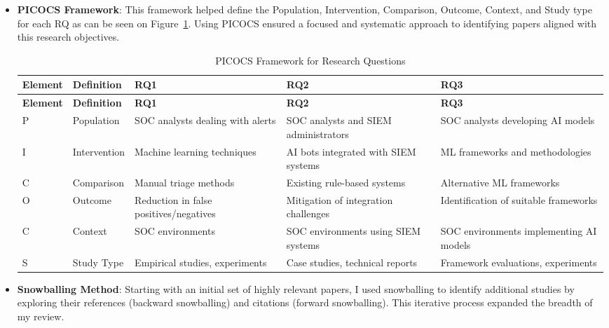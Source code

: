 \begin{itemize}
    \item \textbf{PICOCS Framework}: This framework helped define the Population, Intervention, Comparison, Outcome, Context, and Study type for each RQ as can be seen on Figure~\ref{tab:picocs_rqs}. Using PICOCS ensured a focused and systematic approach to identifying papers aligned with this research objectives.

\captionsetup[table]{font=small} %
\scriptsize %
\begin{longtable}{p{1cm}p{1.5cm}p{3cm}p{3cm}p{3cm}}
    \caption{PICOCS Framework for Research Questions}
    \label{tab:picocs_rqs} \\
    \toprule
    \textbf{Element} & \textbf{Definition} & \textbf{RQ1} & \textbf{RQ2} & \textbf{RQ3} \\
    \midrule
    \endfirsthead
    \toprule
    \textbf{Element} & \textbf{Definition} & \textbf{RQ1} & \textbf{RQ2} & \textbf{RQ3} \\
    \midrule
    \endhead
    \bottomrule
    \endfoot
    \bottomrule
    \endlastfoot
    P & Population & SOC analysts dealing with alerts & SOC analysts and SIEM administrators & SOC analysts developing AI models \\
    I & Intervention & Machine learning techniques & AI bots integrated with SIEM systems & ML frameworks and methodologies \\
    C & Comparison & Manual triage methods & Existing rule-based systems & Alternative ML frameworks \\
    O & Outcome & Reduction in false positives/negatives & Mitigation of integration challenges & Identification of suitable frameworks \\
    C & Context & SOC environments & SOC environments using SIEM systems & SOC environments implementing AI models \\
    S & Study Type & Empirical studies, experiments & Case studies, technical reports & Framework evaluations, experiments \\
\end{longtable}

\normalsize

    \item \textbf{Snowballing Method}: Starting with an initial set of highly relevant papers, I used snowballing to identify additional studies by exploring their references (backward snowballing) and citations (forward snowballing). This iterative process expanded the breadth of my review.
\end{itemize}
    
